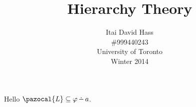 \documentclass[11pt]{article}
\title{Hierarchy Theory}
\date{}
\author{Itai David Hass\\ \#999440243\\ University of Toronto\\ Winter 2014}
\newcommand{\tightoverset}[2]{%
  \mathop{#2}\limits^{\vbox to -.5ex{\kern-0.2ex\hbox{$#1$}\vss}}}
\newcommand{\fnc}[1]    {\pazocal{#1}}
\newcommand{\ms}{\tightoverset{\cdot}{-}}
\renewcommand{\phi}{\varphi}
\theoremstyle{plain}%
\theoremstyle{definition}
\theoremstyle{remark}
\begin{document}
Hello $\fnc L\subseteq \phi \ms a$.
\end{document}
